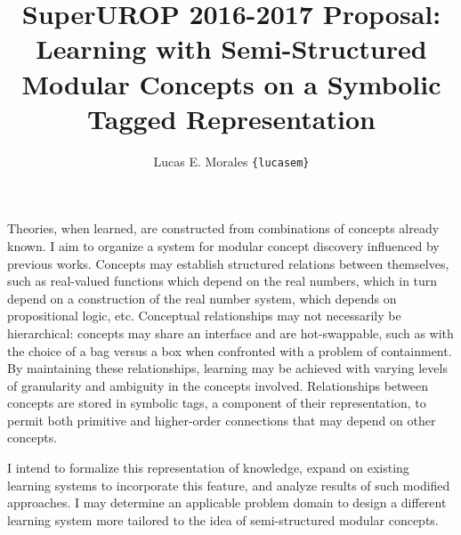 \documentclass[12pt,letterpaper]{article}
\title{{\large SuperUROP 2016-2017 Proposal:}\\
  {\Large Learning with Semi-Structured Modular Concepts on a Symbolic Tagged
Representation}}
\author{Lucas E. Morales \texttt{\{lucasem\}}}
\date{}
\begin{document}
\maketitle

Theories, when learned, are constructed from combinations of concepts
already known. I aim to organize a system for modular concept discovery
influenced by previous works. Concepts may establish structured relations
between themselves, such as real-valued functions which depend on the real
numbers, which in turn depend on a construction of the real number system,
which depends on propositional logic, etc. Conceptual relationships may not
necessarily be hierarchical: concepts may share an interface and are
hot-swappable, such as with the choice of a bag versus a box when confronted
with a problem of containment. By maintaining these relationships, learning
may be achieved with varying levels of granularity and ambiguity in the
concepts involved. Relationships between concepts are stored in symbolic
tags, a component of their representation, to permit both primitive and
higher-order connections that may depend on other concepts.

I intend to formalize this representation of knowledge, expand on existing
learning systems to incorporate this feature, and analyze results of such
modified approaches. I may determine an applicable problem domain to design
a different learning system more tailored to the idea of semi-structured
modular concepts.




%
%
%
%
%
%
\end{document}
